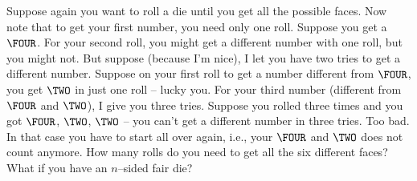 Suppose again you want to roll a die until you get all the possible faces.
Now note that to get your first number, you need only one roll.
Suppose you get a $\FOUR$.
For your second roll, you might    get a different number with one roll, but you might not.
But suppose (because I'm nice), I let you have two tries to get a different number.
Suppose on your first roll to get a number different from $\FOUR$, you get $\TWO$
in just one roll -- lucky you.
For your third number (different from $\FOUR$ and $\TWO$), I give you three tries.
Suppose you rolled three times and you got $\FOUR$, $\TWO$, $\TWO$ -- you can't
get a different number in three tries.
Too bad.
In that case you have to start all over again, i.e., your $\FOUR$ and $\TWO$ does not count anymore.
How many rolls do you need to get all the six different faces?
What if you have an $n$--sided fair die?

